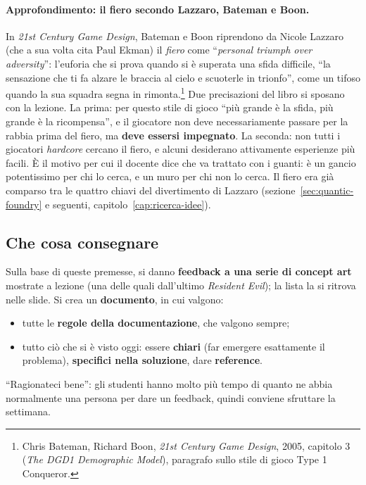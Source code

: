 \paragraph{Approfondimento: il fiero secondo Lazzaro, Bateman e Boon.} In
\emph{21st Century Game Design}, Bateman e Boon riprendono da Nicole
Lazzaro (che a sua volta cita Paul Ekman) il \emph{fiero} come
``\emph{personal triumph over adversity}'': l'euforia che si prova quando si
è superata una sfida difficile, ``la sensazione che ti fa alzare le braccia
al cielo e scuoterle in trionfo'', come un tifoso quando la sua squadra
segna in rimonta.\footnote{Chris Bateman, Richard Boon, \emph{21st Century
Game Design}, 2005, capitolo 3 (\emph{The DGD1 Demographic Model}),
paragrafo sullo stile di gioco Type 1 Conqueror.} Due precisazioni del libro
si sposano con la lezione. La prima: per questo stile di gioco ``più grande
è la sfida, più grande è la ricompensa'', e il giocatore non deve
necessariamente passare per la rabbia prima del fiero, ma \textbf{deve
essersi impegnato}. La seconda: non tutti i giocatori \emph{hardcore}
cercano il fiero, e alcuni desiderano attivamente esperienze più facili. È
il motivo per cui il docente dice che va trattato con i guanti: è un gancio
potentissimo per chi lo cerca, e un muro per chi non lo cerca. Il fiero era
già comparso tra le quattro chiavi del divertimento di Lazzaro
(sezione~\ref{sec:quantic-foundry} e seguenti, capitolo~\ref{cap:ricerca-idee}).

\subsection{Che cosa consegnare}

Sulla base di queste premesse, si danno \textbf{feedback a una serie di
concept art} mostrate a lezione (una delle quali dall'ultimo
\emph{Resident Evil}); la lista la si ritrova nelle slide. Si crea un
\textbf{documento}, in cui valgono:
\begin{itemize}
  \item tutte le \textbf{regole della documentazione}, che valgono sempre;
  \item tutto ciò che si è visto oggi: essere \textbf{chiari} (far emergere
        esattamente il problema), \textbf{specifici nella soluzione},
        dare \textbf{reference}.
\end{itemize}
``Ragionateci bene'': gli studenti hanno molto più tempo di quanto ne abbia
normalmente una persona per dare un feedback, quindi conviene sfruttare la
settimana.

